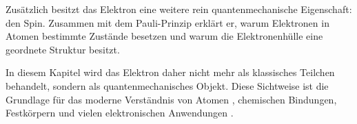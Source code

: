 Zusätzlich besitzt das Elektron eine weitere rein quantenmechanische
Eigenschaft: den Spin. Zusammen mit dem Pauli-Prinzip
 erklärt er, warum Elektronen in Atomen bestimmte
Zustände besetzen und warum die Elektronenhülle
eine geordnete Struktur besitzt.

In diesem Kapitel wird das Elektron daher nicht mehr als klassisches Teilchen
behandelt, sondern als quantenmechanisches Objekt.
Diese Sichtweise ist die Grundlage für das moderne Verständnis von Atomen
, chemischen Bindungen, Festkörpern
 und vielen elektronischen Anwendungen
.

